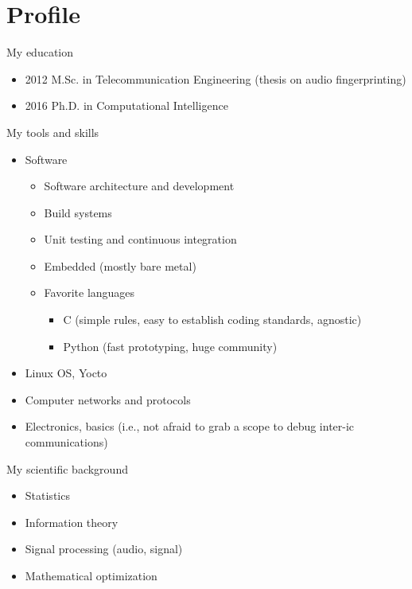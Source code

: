 \documentclass{if-beamer}
\title[]{}
\author{Giulio Luzzati}
\date{}
\begin{document}






\section{Profile}

\begin{frame}
\small
My education


\begin{itemize}
\item 2012 M.Sc. in Telecommunication Engineering (thesis on audio fingerprinting)
\item 2016 Ph.D. in Computational Intelligence
\end{itemize}

My tools and skills


\begin{itemize}
\item Software
\begin{itemize}
\item Software architecture and development
\item Build systems
\item Unit testing and continuous integration
\item Embedded (mostly bare metal)
\item Favorite languages
\begin{itemize}
\item C (simple rules, easy to establish coding standards, agnostic)
\item Python (fast prototyping, huge community)
\end{itemize}
\end{itemize}
\item Linux OS, Yocto
\item Computer networks and protocols
\item Electronics, basics (i.e., not afraid to grab a scope to debug inter-ic communications)
\end{itemize}
My scientific background
\begin{itemize}
\item Statistics
\item Information theory
\item Signal processing (audio, signal)
\item Mathematical optimization
\end{itemize}
\end{frame}
\end{document}
